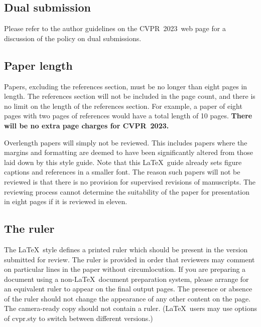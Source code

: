 \documentclass[10pt,twocolumn,letterpaper]{article}
\def\confName{CVPR}
\def\confYear{2023}
\begin{document}
    \subsection{Dual submission}

    Please refer to the author guidelines on the \confName\ \confYear\ web page for a
    discussion of the policy on dual submissions.

    \subsection{Paper length}
    Papers, excluding the references section, must be no longer than eight pages in length.
    The references section will not be included in the page count, and there is no limit on the length of the references section.
    For example, a paper of eight pages with two pages of references would have a total length of 10 pages.
        {\bf There will be no extra page charges for \confName\ \confYear.}

    Overlength papers will simply not be reviewed.
    This includes papers where the margins and formatting are deemed to have been significantly altered from those laid down by this style guide.
    Note that this \LaTeX\ guide already sets figure captions and references in a smaller font.
    The reason such papers will not be reviewed is that there is no provision for supervised revisions of manuscripts.
    The reviewing process cannot determine the suitability of the paper for presentation in eight pages if it is reviewed in eleven.


    \subsection{The ruler}
    The \LaTeX\ style defines a printed ruler which should be present in the version submitted for review.
    The ruler is provided in order that reviewers may comment on particular lines in the paper without circumlocution.
    If you are preparing a document using a non-\LaTeX\ document preparation system, please arrange for an equivalent ruler to appear on the final output pages.
    The presence or absence of the ruler should not change the appearance of any other content on the page.
    The camera-ready copy should not contain a ruler.
    (\LaTeX\ users may use options of cvpr.sty to switch between different versions.)
\end{document}

